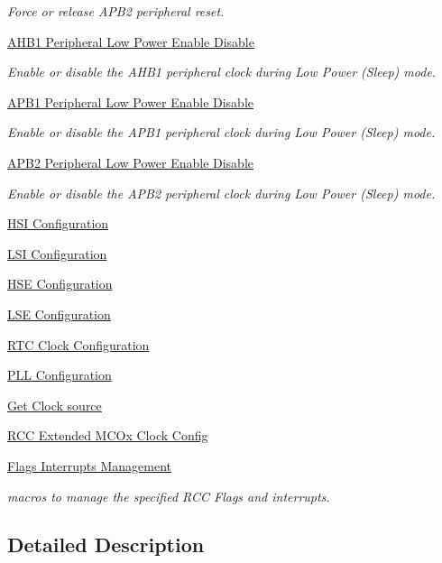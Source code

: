 \begin{DoxyCompactItemize}
\begin{DoxyCompactList}\small\item\em Force or release A\+P\+B2 peripheral reset. \end{DoxyCompactList}\item 
\hyperlink{group___r_c_c___a_h_b1___low_power___enable___disable}{A\+H\+B1 Peripheral Low Power Enable Disable}
\begin{DoxyCompactList}\small\item\em Enable or disable the A\+H\+B1 peripheral clock during Low Power (Sleep) mode. \end{DoxyCompactList}\item 
\hyperlink{group___r_c_c___a_p_b1___low_power___enable___disable}{A\+P\+B1 Peripheral Low Power Enable Disable}
\begin{DoxyCompactList}\small\item\em Enable or disable the A\+P\+B1 peripheral clock during Low Power (Sleep) mode. \end{DoxyCompactList}\item 
\hyperlink{group___r_c_c___a_p_b2___low_power___enable___disable}{A\+P\+B2 Peripheral Low Power Enable Disable}
\begin{DoxyCompactList}\small\item\em Enable or disable the A\+P\+B2 peripheral clock during Low Power (Sleep) mode. \end{DoxyCompactList}\item 
\hyperlink{group___r_c_c___h_s_i___configuration}{H\+S\+I Configuration}
\item 
\hyperlink{group___r_c_c___l_s_i___configuration}{L\+S\+I Configuration}
\item 
\hyperlink{group___r_c_c___h_s_e___configuration}{H\+S\+E Configuration}
\item 
\hyperlink{group___r_c_c___l_s_e___configuration}{L\+S\+E Configuration}
\item 
\hyperlink{group___r_c_c___internal___r_t_c___clock___configuration}{R\+T\+C Clock Configuration}
\item 
\hyperlink{group___r_c_c___p_l_l___configuration}{P\+L\+L Configuration}
\item 
\hyperlink{group___r_c_c___get___clock__source}{Get Clock source}
\item 
\hyperlink{group___r_c_c_ex___m_c_ox___clock___config}{R\+C\+C Extended M\+C\+Ox Clock Config}
\item 
\hyperlink{group___r_c_c___flags___interrupts___management}{Flags Interrupts Management}
\begin{DoxyCompactList}\small\item\em macros to manage the specified R\+CC Flags and interrupts. \end{DoxyCompactList}\end{DoxyCompactItemize}


\subsection{Detailed Description}
